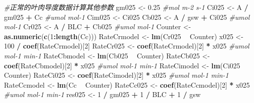 \documentclass[
]{krantz}
\makeatletter
\newenvironment{Shaded}{\begin{snugshade}}{\end{snugshade}}
\newcommand{\CommentTok}[1]{\textcolor[rgb]{0.56,0.35,0.01}{\textit{#1}}}
\newcommand{\DecValTok}[1]{\textcolor[rgb]{0.00,0.00,0.81}{#1}}
\newcommand{\FloatTok}[1]{\textcolor[rgb]{0.00,0.00,0.81}{#1}}
\newcommand{\KeywordTok}[1]{\textcolor[rgb]{0.13,0.29,0.53}{\textbf{#1}}}
\newcommand{\NormalTok}[1]{#1}
\newcommand{\OperatorTok}[1]{\textcolor[rgb]{0.81,0.36,0.00}{\textbf{#1}}}
\newcommand{\StringTok}[1]{\textcolor[rgb]{0.31,0.60,0.02}{#1}}
\newenvironment{kframe}{%
\medskip{}
\setlength{\fboxsep}{.8em}
 \def\at@end@of@kframe{}%
 \ifinner\ifhmode%
  \def\at@end@of@kframe{\end{minipage}}%
  \begin{minipage}{\columnwidth}%
 \fi\fi%
 \def\FrameCommand##1{\hskip\@totalleftmargin \hskip-\fboxsep
 \colorbox{shadecolor}{##1}\hskip-\fboxsep
     \hskip-\linewidth \hskip-\@totalleftmargin \hskip\columnwidth}%
 \MakeFramed {\advance\hsize-\width
   \@totalleftmargin\z@ \linewidth\hsize
   \@setminipage}}%
 {\par\unskip\endMakeFramed%
 \at@end@of@kframe}
\renewenvironment{Shaded}{\begin{kframe}}{\end{kframe}}
\makeatother
\begin{document}
\begin{Shaded}
\begin{Highlighting}[]
\CommentTok{#正常的叶肉导度数据计算其他参数}
\NormalTok{gm025 <-}\StringTok{ }\FloatTok{0.25} \CommentTok{#mol m-2 s-1}
\NormalTok{Ci025 <-}\StringTok{ }\NormalTok{A }\OperatorTok{/}\StringTok{ }\NormalTok{gm025 }\OperatorTok{+}\StringTok{ }\NormalTok{Cc }\CommentTok{#umol mol-1}
\NormalTok{Cim025 <-}\StringTok{ }\NormalTok{Ci025}
\NormalTok{Cb025 <-}\StringTok{ }\NormalTok{A }\OperatorTok{/}\StringTok{ }\NormalTok{gsw }\OperatorTok{+}\StringTok{ }\NormalTok{Ci025 }\CommentTok{#umol mol-1}
\NormalTok{Cr025 <-}\StringTok{ }\NormalTok{A }\OperatorTok{/}\StringTok{ }\NormalTok{BLC }\OperatorTok{+}\StringTok{ }\NormalTok{Cb025 }\CommentTok{#umol mol-1}
\NormalTok{Counter <-}\StringTok{ }\KeywordTok{as.numeric}\NormalTok{(}\KeywordTok{c}\NormalTok{(}\DecValTok{1}\OperatorTok{:}\KeywordTok{length}\NormalTok{(Cc)))}
\NormalTok{RateCrmodel <-}\StringTok{ }\KeywordTok{lm}\NormalTok{(Cr025 }\OperatorTok{~}\StringTok{ }\NormalTok{Counter)}
\NormalTok{x025 <-}\StringTok{ }\DecValTok{100} \OperatorTok{/}\StringTok{ }\KeywordTok{coef}\NormalTok{(RateCrmodel)[}\DecValTok{2}\NormalTok{]}
\NormalTok{RateCr025 <-}\StringTok{ }\KeywordTok{coef}\NormalTok{(RateCrmodel)[}\DecValTok{2}\NormalTok{] }\OperatorTok{*}\StringTok{ }\NormalTok{x025 }\CommentTok{#umol mol-1 min-1}
\NormalTok{RateCbmodel <-}\StringTok{ }\KeywordTok{lm}\NormalTok{(Cb025 }\OperatorTok{~}\StringTok{ }\NormalTok{Counter)}
\NormalTok{RateCb025 <-}\StringTok{ }\KeywordTok{coef}\NormalTok{(RateCbmodel)[}\DecValTok{2}\NormalTok{] }\OperatorTok{*}\StringTok{ }\NormalTok{x025 }\CommentTok{#umol mol-1 min-1}
\NormalTok{RateCimodel <-}\StringTok{ }\KeywordTok{lm}\NormalTok{(Ci025 }\OperatorTok{~}\StringTok{ }\NormalTok{Counter)}
\NormalTok{RateCi025 <-}\StringTok{ }\KeywordTok{coef}\NormalTok{(RateCimodel)[}\DecValTok{2}\NormalTok{] }\OperatorTok{*}\StringTok{ }\NormalTok{x025 }\CommentTok{#umol mol-1 min-1}
\NormalTok{RateCcmodel <-}\StringTok{ }\KeywordTok{lm}\NormalTok{(Cc }\OperatorTok{~}\StringTok{ }\NormalTok{Counter)}
\NormalTok{RateCc025 <-}\StringTok{ }\KeywordTok{coef}\NormalTok{(RateCcmodel)[}\DecValTok{2}\NormalTok{] }\OperatorTok{*}\StringTok{ }\NormalTok{x025 }\CommentTok{#umol mol-1 min-1}
\NormalTok{res025 <-}\StringTok{ }\DecValTok{1} \OperatorTok{/}\StringTok{ }\NormalTok{gm025 }\OperatorTok{+}\StringTok{ }\DecValTok{1} \OperatorTok{/}\StringTok{ }\NormalTok{BLC }\OperatorTok{+}\StringTok{ }\DecValTok{1} \OperatorTok{/}\StringTok{ }\NormalTok{gsw}


\end{Highlighting}
\end{Shaded}
\end{document}
